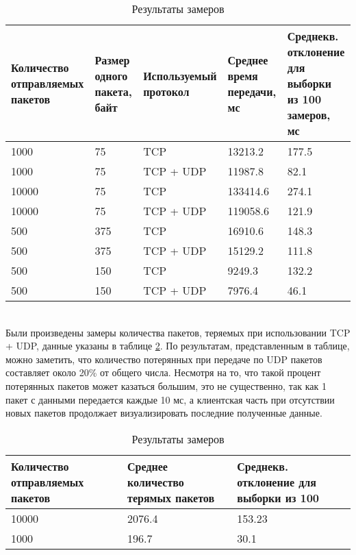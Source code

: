 \documentclass[conference]{IEEEtran}
\begin{document}
\begin{table}
\centering
  \caption{Результаты замеров}
  \label{tab:table1}
  \begin{tabular}{|p{1.3 cm}|p{1 cm}|p{1.7 cm}|p{1 cm}|p{1.5 cm}|}
    \hline
    Количество отправляемых пакетов & Размер одного пакета, байт & Используемый протокол & Среднее время передачи, мс & Среднекв. отклонение для выборки из 100 замеров, мс\\
    \hline
    1000 & 75 & TCP & 13213.2 & 177.5\\
    \hline
    1000 & 75 & TCP + UDP & 11987.8 & 82.1\\
    \hline
    10000 & 75 & TCP & 133414.6 & 274.1 \\
    \hline 
    10000 & 75 & TCP + UDP & 119058.6 & 121.9 \\
    \hline
    500 & 375 & TCP & 16910.6 & 148.3 \\
    \hline
    500 & 375 & TCP + UDP & 15129.2 & 111.8 \\
    \hline
    500 & 150 & TCP & 9249.3 & 132.2 \\
    \hline
    500 & 150 & TCP + UDP & 7976.4 & 46.1 \\
    \hline
  \end{tabular}
\end{table}
\\

Были произведены замеры количества пакетов, теряемых при использовании TCP + UDP, данные указаны в таблице \ref{tab:table2}. По результатам, представленным в таблице, можно заметить, что количество потерянных при передаче по UDP пакетов составляет около 20\% от общего числа. Несмотря на то, что такой процент потерянных пакетов может казаться большим,
это не существенно, так как 1 пакет с данными передается каждые 10 мс, а клиентская часть при отсутствии новых пакетов продолжает визуализировать последние полученные данные.

\begin{table}
\centering
  \caption{Результаты замеров}
  \label{tab:table2}
  \begin{tabular}{|p{1.5 cm}|p{1.5 cm}|p{1.5 cm}|}
    \hline
	Количество отправляемых пакетов & Среднее количество терямых пакетов & Среднекв. отклонение для выборки из 100 \\
	\hline
	10000 & 2076.4 & 153.23 \\
	\hline
	1000 & 196.7 & 30.1 \\
	\hline
  \end{tabular}
\end{table}
\\
\end{document}
